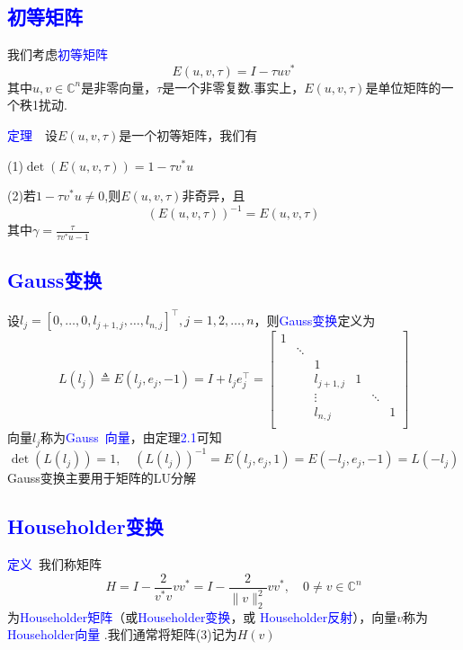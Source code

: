\documentclass[12pt,a4paper]{article}
\begin{document}
\subsection{\textcolor{blue}{初等矩阵}}
\noindent 我们考虑\textcolor{blue}{初等矩阵}$$E(u, v, \tau)=I-\tau u v^*$$
其中$u,v\in \mathbb{C}^n$是非零向量，$\tau$是一个非零复数.事实上，$E(u,v,\tau)$是单位矩阵的一个秩1扰动.

\noindent \textcolor{blue}{定理}~~设$E(u,v,\tau)$是一个初等矩阵，我们有

(1)$\operatorname{det}(E(u, v, \tau))=1-\tau v^{*} u$

(2)若$1-\tau v^* u \neq 0$,则$E(u,v,\tau)$非奇异，且
$$(E(u,v,\tau))^{-1}=E(u,v,\tau)$$
其中$\gamma=\frac{\tau}{\tau v^{*} u-1}$

\subsection{\textcolor{blue}{Gauss变换}}
\noindent 设$l_{j}=\left[0, \ldots, 0, l_{j+1, j}, \ldots, l_{n,
j}\right]^{\top}, j=1,2, \ldots, n$，则\textcolor{blue}{Gauss变换}定义为$$
L\left(l_{j}\right) \triangleq E\left(l_{j}, e_{j},-1\right)=I+l_{j}
e_{j}^{\top}=\begin{bmatrix}
             1 &  &  &  &   &  \\
              & \ddots &  &  &  & \\
              & & 1 & & & \\
              & & l_{j+1,j}& 1  & & \\
              & & \vdots & & \ddots & \\
              & & l_{n,j} & & & 1\\
\end{bmatrix}
$$
向量$l_j$称为\textcolor{blue}{Gauss~向量}，由定理\textcolor{blue}{2.1}可知$$
\operatorname{det}\left(L\left(l_{j}\right)\right)=1, \quad\left(L\left(l_{j}\right)\right)^{-1}=E\left(l_{j}, e_{j}, 1\right)=E\left(-l_{j}, e_{j},-1\right)=L\left(-l_{j}\right)
$$
Gauss变换主要用于矩阵的LU分解

\subsection{\textcolor{blue}{Householder变换}}
\noindent \textcolor{blue}{定义}~我们称矩阵
\begin{equation}
    H=I-\frac{2}{v^{*} v} v v^{*}=I-\frac{2}{\|v\|_{2}^{2}} v v^{*}, \quad 0 \neq v \in \mathbb{C}^{n}
\end{equation}
为\textcolor{blue}{Householder矩阵}（或\textcolor{blue}{Householder变换}，或
\textcolor{blue}{Householder反射}），向量$v$称为\textcolor{blue}{Householder向量
}.我们通常将矩阵(3)记为$H(v)$\\
\end{document}
